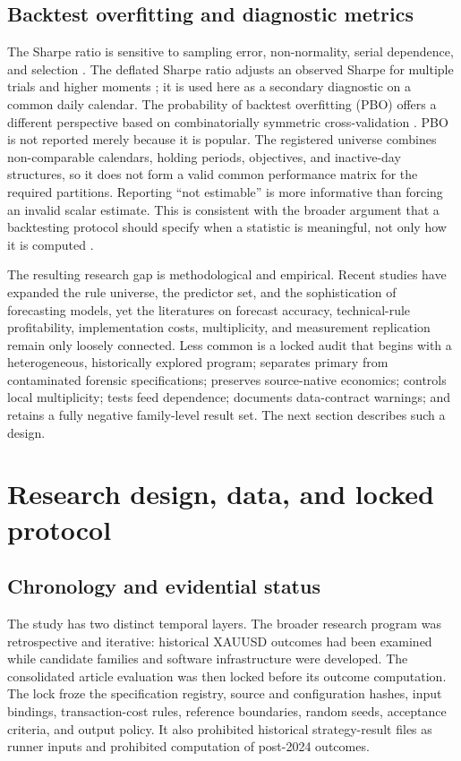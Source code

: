 \subsection{Backtest overfitting and diagnostic metrics}

The Sharpe ratio is sensitive to sampling error, non-normality, serial dependence, and selection \citep{lo2002}. The deflated Sharpe ratio adjusts an observed Sharpe for multiple trials and higher moments \citep{bailey2014}; it is used here as a secondary diagnostic on a common daily calendar. The probability of backtest overfitting (PBO) offers a different perspective based on combinatorially symmetric cross-validation \citep{bailey2017}. PBO is not reported merely because it is popular. The registered universe combines non-comparable calendars, holding periods, objectives, and inactive-day structures, so it does not form a valid common performance matrix for the required partitions. Reporting ``not estimable'' is more informative than forcing an invalid scalar estimate. This is consistent with the broader argument that a backtesting protocol should specify when a statistic is meaningful, not only how it is computed \citep{arnott2019}.

The resulting research gap is methodological and empirical. Recent studies have expanded the rule universe, the predictor set, and the sophistication of forecasting models, yet the literatures on forecast accuracy, technical-rule profitability, implementation costs, multiplicity, and measurement replication remain only loosely connected. Less common is a locked audit that begins with a heterogeneous, historically explored program; separates primary from contaminated forensic specifications; preserves source-native economics; controls local multiplicity; tests feed dependence; documents data-contract warnings; and retains a fully negative family-level result set. The next section describes such a design.

\section{Research design, data, and locked protocol}\label{sec:design}

\subsection{Chronology and evidential status}\label{subsec:chronology}

The study has two distinct temporal layers. The broader research program was retrospective and iterative: historical XAUUSD outcomes had been examined while candidate families and software infrastructure were developed. The consolidated article evaluation was then locked before its outcome computation. The lock froze the specification registry, source and configuration hashes, input bindings, transaction-cost rules, reference boundaries, random seeds, acceptance criteria, and output policy. It also prohibited historical strategy-result files as runner inputs and prohibited computation of post-2024 outcomes.

